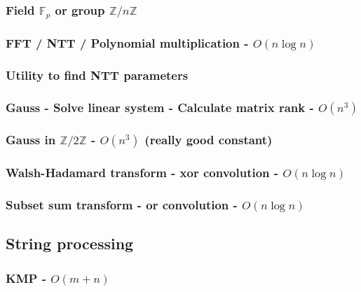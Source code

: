 \documentclass[landscape,a4paper,twocolumn,10pt]{report}
\begin{document}
\subsubsection{Field $\mathbb F_p$ or group $\mathbb Z/n\mathbb Z$}


\subsubsection{FFT / NTT / Polynomial multiplication - $O(n \log n)$}


\subsubsection{Utility to find NTT parameters}


\subsubsection{Gauss - Solve linear system - Calculate matrix rank - $O(n^3)$}


\subsubsection{Gauss in $\mathbb Z/2\mathbb Z$ - $O(n^3)$ (really good constant)}


\subsubsection{Walsh-Hadamard transform - xor convolution - $O(n \log n)$}


\subsubsection{Subset sum transform - or convolution - $O(n \log n)$}


\subsection*{String processing}
\label{string}

\subsubsection{KMP - $O(m+n)$}

\end{document}
